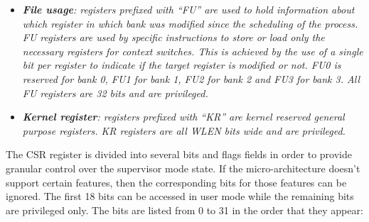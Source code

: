 \documentclass{article}
\begin{document}
\begin{itemize}
                    \item \textit{\textbf{File usage}: registers prefixed with ``FU'' are used to hold information about which register in which bank was modified since the scheduling of the process. FU registers are used by specific instructions to store or load only the necessary registers for context switches. This is achieved by the use of a single bit per register to indicate if the target register is modified or not. FU0 is reserved for bank 0, FU1 for bank 1, FU2 for bank 2 and FU3 for bank 3. All FU registers are 32 bits and are privileged.}

                    \item \textit{\textbf{Kernel register}: registers prefixed with ``KR'' are kernel reserved general purpose registers. KR registers are all WLEN bits wide and are privileged.}

                \end{itemize}

                The CSR register is divided into several bits and flags fields in order to provide granular control over the supervisor mode state. If the micro-architecture doesn't support certain features, then the corresponding bits for those features can be ignored. The first 18 bits can be accessed in user mode while the remaining bits are privileged only. The bits are listed from 0 to 31 in the order that they appear:
\end{document}
